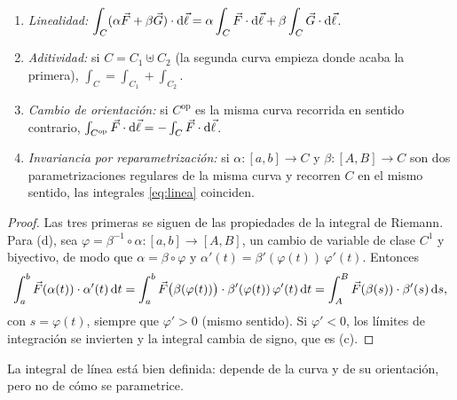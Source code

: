 \begin{proposicion}\label{prop:prop-linea}
\begin{enumerate}[label=(\alph*)]
  \item \emph{Linealidad:} $\displaystyle\int_C(\alpha\vec{F}+\beta\vec{G})\cdot\mathrm{d}\vec{\ell}=\alpha\int_C\vec{F}\cdot\mathrm{d}\vec{\ell}+\beta\int_C\vec{G}\cdot\mathrm{d}\vec{\ell}$.
  \item \emph{Aditividad:} si $C=C_1\uplus C_2$ (la segunda curva empieza donde acaba la primera), $\int_C=\int_{C_1}+\int_{C_2}$.
  \item \emph{Cambio de orientación:} si $C^{\mathrm{op}}$ es la misma curva recorrida en sentido contrario, $\int_{C^{\mathrm{op}}}\vec{F}\cdot\mathrm{d}\vec{\ell}=-\int_C\vec{F}\cdot\mathrm{d}\vec{\ell}$.
  \item \emph{Invariancia por reparametrización:} si $\alpha:[a,b]\to C$ y
        $\beta:[A,B]\to C$ son dos parametrizaciones regulares de la misma curva y
        recorren $C$ en el mismo sentido, las integrales \eqref{eq:linea}
        coinciden.
\end{enumerate}
\end{proposicion}
\begin{proof}
Las tres primeras se siguen de las propiedades de la integral de Riemann.
Para (d), sea $\varphi=\beta^{-1}\circ\alpha:[a,b]\to[A,B]$, un cambio de
variable de clase $C^{1}$ y biyectivo, de modo que $\alpha=\beta\circ\varphi$ y
$\alpha'(t)=\beta'(\varphi(t))\,\varphi'(t)$. Entonces
\[
  \int_a^b\vec{F}(\alpha(t))\cdot\alpha'(t)\,\mathrm{d} t
  =\int_a^b\vec{F}\bigl(\beta(\varphi(t))\bigr)\cdot\beta'(\varphi(t))\,\varphi'(t)\,\mathrm{d} t
  =\int_A^B\vec{F}(\beta(s))\cdot\beta'(s)\,\mathrm{d} s ,
\]
con $s=\varphi(t)$, siempre que $\varphi'>0$ (mismo sentido). Si $\varphi'<0$, los
límites de integración se invierten y la integral cambia de signo, que es (c).
\end{proof}

La integral de línea está bien definida: depende de la curva y de su
orientación, pero no de cómo se parametrice.

